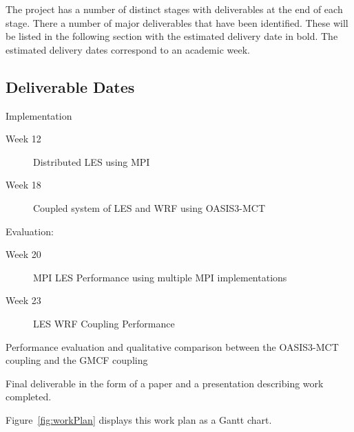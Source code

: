 The project has a number of distinct stages with deliverables at the end of each
stage. There a number of major deliverables that have been identified. These
will be listed in the following section with the estimated delivery date in
bold. The estimated delivery dates correspond to an academic week.

\subsection{Deliverable Dates}

\begin{description}
    \item
    \item[Week 18] Implementation
    \begin{description}
        \item[Week 12] Distributed LES using MPI
        \item[Week 18] Coupled system of LES and WRF using OASIS3-MCT
    \end{description}
    \item[Week 23] Evaluation:
    \begin{description}
        \item[Week 20] MPI LES Performance using multiple MPI implementations
        \item[Week 23] LES WRF Coupling Performance
    \end{description}
    \item[Week 27] Performance evaluation and qualitative comparison between
    the OASIS3-MCT coupling and the GMCF coupling
    \item[Week 31] Final deliverable in the form of a paper and a presentation
    describing work completed.
\end{description}

Figure~\ref{fig:workPlan} displays this work plan as a Gantt chart.

